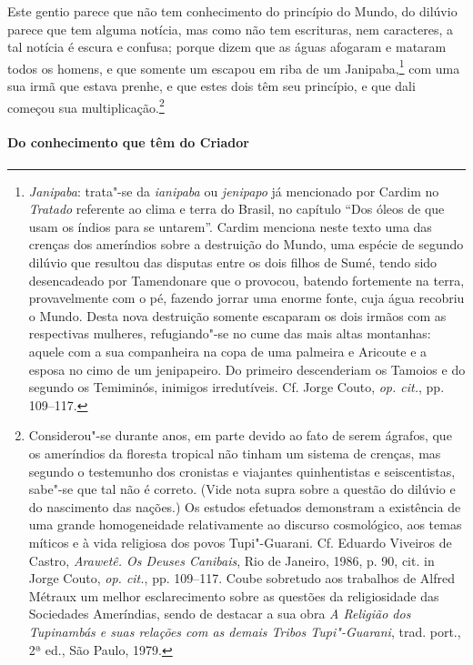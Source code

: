 Este gentio parece que não tem conhecimento do
princípio do Mundo, do dilúvio parece que tem alguma notícia, mas como
não tem escrituras, nem caracteres, a tal notícia é escura e confusa;
porque dizem que as águas afogaram e mataram todos os homens, e que
somente um escapou em riba de um Janipaba,\footnote{ \textit{Janipaba}: 
trata"-se da \textit{ianipaba} ou \textit{jenipapo} já mencionado por
Cardim no \textit{Tratado} referente ao clima e terra do Brasil, no
capítulo ``Dos óleos de que usam os índios para se untarem''. Cardim
menciona neste texto uma das crenças dos ameríndios sobre a destruição
do Mundo, uma espécie de segundo dilúvio que resultou das disputas
entre os dois filhos de Sumé, tendo sido desencadeado por Tamendonare
que o provocou, batendo fortemente na terra, provavelmente com o pé,
fazendo jorrar uma enorme fonte, cuja água recobriu o Mundo. Desta nova
destruição somente escaparam os dois irmãos com as respectivas
mulheres, refugiando"-se no cume das mais altas montanhas: aquele com a
sua companheira na copa de uma palmeira e Aricoute e a esposa no cimo
de um jenipapeiro. Do primeiro descenderiam os Tamoios e do segundo os
Temiminós, inimigos irredutíveis. Cf. Jorge Couto, \textit{op. cit.}, pp. 109--117.} 
com uma sua irmã que estava prenhe, e que estes dois têm
seu princípio, e que dali começou sua multiplicação.\footnote{ Considerou"-se 
durante anos, em parte devido ao fato de serem ágrafos,
que os ameríndios da floresta tropical não tinham um sistema de
crenças, mas segundo o testemunho dos cronistas e viajantes
quinhentistas e seiscentistas, sabe"-se que tal não é correto. (Vide
nota supra sobre a questão do dilúvio e do nascimento das nações.) Os
estudos efetuados demonstram a existência de uma grande homogeneidade
relativamente ao discurso cosmológico, aos temas míticos e à vida
religiosa dos povos Tupi"-Guarani. Cf. Eduardo Viveiros de Castro,
\textit{Arawetê. Os Deuses Canibais}, Rio de Janeiro, 1986, p. 90, cit.
in Jorge Couto, \textit{op. cit.}, pp. 109--117. Coube sobretudo aos
trabalhos de Alfred Métraux um melhor esclarecimento sobre as questões
da religiosidade das Sociedades Ameríndias, sendo de destacar a sua
obra \textit{A Religião dos Tupinambás e suas relações com as demais
Tribos Tupi"-Guarani}, trad. port., 2ª ed., São Paulo, 1979.} 

\paragraph{Do conhecimento que têm do Criador}

